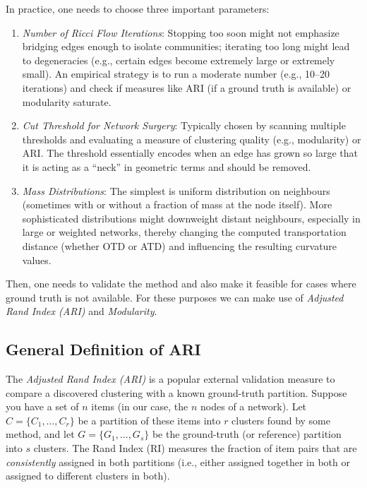 In practice, one needs to choose three important parameters:
\begin{enumerate}
    \item \emph{Number of Ricci Flow Iterations}: Stopping too soon might not emphasize bridging edges enough to isolate communities; iterating too long might lead to degeneracies (e.g., certain edges become extremely large or extremely small). An empirical strategy is to run a moderate number (e.g., 10--20 iterations) and check if measures like ARI (if a ground truth is available) or modularity saturate.

    \item \emph{Cut Threshold for Network Surgery}: Typically chosen by scanning multiple thresholds and evaluating a measure of clustering quality (e.g., modularity) or ARI. The threshold essentially encodes when an edge has grown so large that it is acting as a “neck” in geometric terms and should be removed.

    \item \emph{Mass Distributions}: The simplest is uniform distribution on neighbours (sometimes with or without a fraction of mass at the node itself). More sophisticated distributions might downweight distant neighbours, especially in large or weighted networks, thereby changing the computed transportation distance (whether OTD or ATD) and influencing the resulting curvature values.
\end{enumerate}

Then, one needs to validate the method and also make it feasible for cases where ground truth is not available. For these purposes we can make use of \emph{Adjusted Rand Index (ARI)} and \emph{Modularity}.

\subsection{General Definition of ARI}
The \emph{Adjusted Rand Index (ARI)} is a popular external validation measure to compare a discovered clustering with a known ground-truth partition. Suppose you have a set of $n$ items (in our case, the $n$ nodes of a network). Let $C = \{C_1, \ldots, C_r\}$ be a partition of these items into $r$ clusters found by some method, and let $G = \{G_1, \ldots, G_s\}$ be the ground-truth (or reference) partition into $s$ clusters. The Rand Index (RI) measures the fraction of item pairs that are \emph{consistently} assigned in both partitions (i.e., either assigned together in both or assigned to different clusters in both). 

